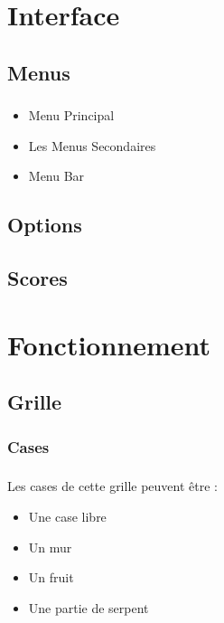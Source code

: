 \documentclass{beamer}
\begin{document}
\section{Interface}
\subsection{Menus}
\begin{frame}
\frametitle{\insertsubsection}
\framesubtitle{\insertsection}
\begin{itemize}
\item Menu Principal
\item Les Menus Secondaires
\item Menu Bar
\end{itemize}
\end{frame}
\subsection{Options}
\begin{frame}
\frametitle{\insertsubsection}
\framesubtitle{\insertsection}

\end{frame}
\subsection{Scores}
\begin{frame}
\frametitle{\insertsubsection}
\framesubtitle{\insertsection}

\end{frame}

\section{Fonctionnement}
\subsection{Grille}
\subsubsection{Cases}
\begin{frame}
\frametitle{\insertsubsubsection}
\framesubtitle{\insertsubsection}
Les cases de cette grille peuvent être :\\
\begin{itemize}
\item Une case libre
\item Un mur
\item Un fruit
\item Une partie de serpent
\end{itemize}
\end{frame}
\end{document}
